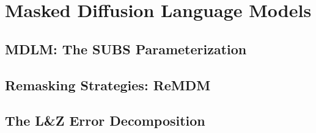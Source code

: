 \chapter{Masked Diffusion Language Models}
\label{ch:masked-diffusion}


\section{MDLM: The SUBS Parameterization}
\label{sec:mdlm-subs}


\section{Remasking Strategies: ReMDM}
\label{sec:remdm}


\section{The L\&Z Error Decomposition}
\label{sec:lz-decomposition}


